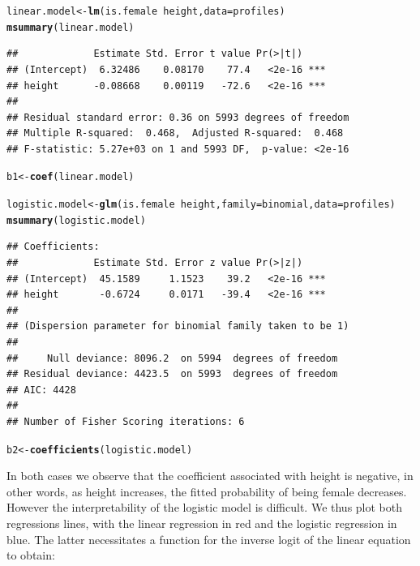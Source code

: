 \documentclass{article}\usepackage[]{graphicx}\usepackage[]{color}
\makeatletter
\newcommand{\hlopt}[1]{\textcolor[rgb]{0,0,0}{#1}}%
\newcommand{\hlstd}[1]{\textcolor[rgb]{0.345,0.345,0.345}{#1}}%
\newcommand{\hlkwb}[1]{\textcolor[rgb]{0.69,0.353,0.396}{#1}}%
\newcommand{\hlkwc}[1]{\textcolor[rgb]{0.333,0.667,0.333}{#1}}%
\newcommand{\hlkwd}[1]{\textcolor[rgb]{0.737,0.353,0.396}{\textbf{#1}}}%
\newenvironment{kframe}{%
 \def\at@end@of@kframe{}%
 \ifinner\ifhmode%
  \def\at@end@of@kframe{\end{minipage}}%
  \begin{minipage}{\columnwidth}%
 \fi\fi%
 \def\FrameCommand##1{\hskip\@totalleftmargin \hskip-\fboxsep
 \colorbox{shadecolor}{##1}\hskip-\fboxsep
     \hskip-\linewidth \hskip-\@totalleftmargin \hskip\columnwidth}%
 \MakeFramed {\advance\hsize-\width
   \@totalleftmargin\z@ \linewidth\hsize
   \@setminipage}}%
 {\par\unskip\endMakeFramed%
 \at@end@of@kframe}
\newenvironment{knitrout}{}{} %
\makeatother
\begin{document}
\begin{knitrout}
\color{fgcolor}\begin{kframe}
\begin{alltt}
\hlstd{linear.model} \hlkwb{<-} \hlkwd{lm}\hlstd{(is.female} \hlopt{~} \hlstd{height,} \hlkwc{data}\hlstd{=profiles)}
\hlkwd{msummary}\hlstd{(linear.model)}
\end{alltt}
\begin{verbatim}
##             Estimate Std. Error t value Pr(>|t|)    
## (Intercept)  6.32486    0.08170    77.4   <2e-16 ***
## height      -0.08668    0.00119   -72.6   <2e-16 ***
## 
## Residual standard error: 0.36 on 5993 degrees of freedom
## Multiple R-squared:  0.468,	Adjusted R-squared:  0.468 
## F-statistic: 5.27e+03 on 1 and 5993 DF,  p-value: <2e-16
\end{verbatim}
\begin{alltt}
\hlstd{b1} \hlkwb{<-} \hlkwd{coef}\hlstd{(linear.model)}
\end{alltt}
\end{kframe}
\end{knitrout}

\begin{knitrout}
\color{fgcolor}\begin{kframe}
\begin{alltt}
\hlstd{logistic.model} \hlkwb{<-} \hlkwd{glm}\hlstd{(is.female} \hlopt{~} \hlstd{height,} \hlkwc{family}\hlstd{=binomial,} \hlkwc{data}\hlstd{=profiles)}
\hlkwd{msummary}\hlstd{(logistic.model)}
\end{alltt}
\begin{verbatim}
## Coefficients:
##             Estimate Std. Error z value Pr(>|z|)    
## (Intercept)  45.1589     1.1523    39.2   <2e-16 ***
## height       -0.6724     0.0171   -39.4   <2e-16 ***
## 
## (Dispersion parameter for binomial family taken to be 1)
## 
##     Null deviance: 8096.2  on 5994  degrees of freedom
## Residual deviance: 4423.5  on 5993  degrees of freedom
## AIC: 4428
## 
## Number of Fisher Scoring iterations: 6
\end{verbatim}
\begin{alltt}
\hlstd{b2} \hlkwb{<-} \hlkwd{coefficients}\hlstd{(logistic.model)}
\end{alltt}
\end{kframe}
\end{knitrout}

In both cases we observe that the coefficient associated with height is negative, in other words, as height increases, the fitted probability of being female decreases.  However the interpretability of the logistic model is difficult.  We thus plot both regressions lines, with the linear regression in red and the logistic regression in blue.  The latter necessitates a function for the inverse logit of the linear equation to obtain:
\end{document}
